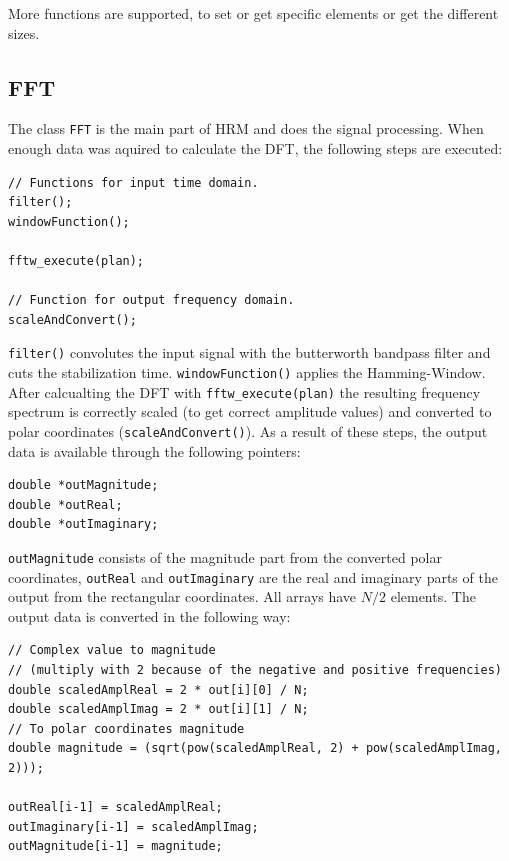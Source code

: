 \documentclass[notitlepage]{scrreprt}
\begin{document}
More functions are supported, to set or get specific elements or get the different sizes.

\subsection{FFT}
The class \lstinline{FFT} is the main part of HRM and does the signal processing. When enough data was aquired to calculate the DFT, the following steps are executed:

\begin{lstlisting}[caption=FFT.c]
// Functions for input time domain.
filter();
windowFunction();

fftw_execute(plan);

// Function for output frequency domain.
scaleAndConvert();
\end{lstlisting}

\lstinline{filter()} convolutes the input signal with the butterworth bandpass filter and cuts the stabilization time. \lstinline{windowFunction()} applies the Hamming-Window. After calcualting the DFT with \lstinline{fftw_execute(plan)} the resulting frequency spectrum is correctly scaled (to get correct amplitude values) and converted to polar coordinates (\lstinline{scaleAndConvert()}). As a result of these steps, the output data is available through the following pointers:

\begin{lstlisting}[caption=FFT.c]
double *outMagnitude;
double *outReal;
double *outImaginary;
\end{lstlisting}

\lstinline{outMagnitude} consists of the magnitude part from the converted polar coordinates, \lstinline{outReal} and \lstinline{outImaginary} are the real and imaginary parts of the output from the rectangular coordinates. All arrays have $N/2$ elements. The output data is converted in the following way:

\begin{lstlisting}[caption=FFT.c]
// Complex value to magnitude
// (multiply with 2 because of the negative and positive frequencies)
double scaledAmplReal = 2 * out[i][0] / N;
double scaledAmplImag = 2 * out[i][1] / N;
// To polar coordinates magnitude
double magnitude = (sqrt(pow(scaledAmplReal, 2) + pow(scaledAmplImag, 2)));

outReal[i-1] = scaledAmplReal;
outImaginary[i-1] = scaledAmplImag;
outMagnitude[i-1] = magnitude;
\end{lstlisting}
\end{document}
